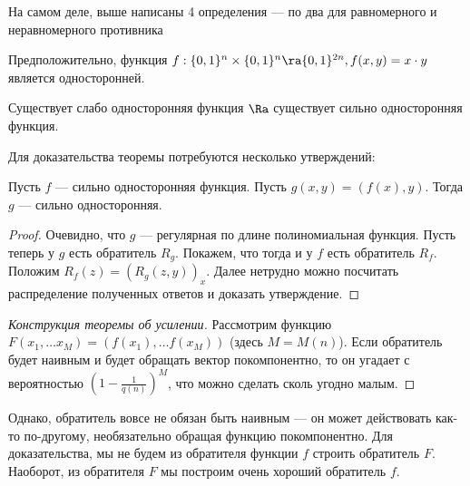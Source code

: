 \begin{note}
    На самом деле, выше написаны 4 определения --- по два для равномерного и неравномерного противника
\end{note}

\begin{note}
    Предположительно, функция \(f: \{0, 1\}^n \times \{0, 1\}^n \ra \{0, 1\}^{2n}, f(x, y) = x \cdot y\) является односторонней.
\end{note}

\begin{theorem}[Об усилении]
    Существует слабо односторонняя функция \(\Ra\) существует сильно односторонняя функция.
\end{theorem}

Для доказательства теоремы потребуются несколько утверждений:

\begin{proposition}
    Пусть \(f\) --- сильно односторонняя функция. Пусть \(g(x, y) = (f(x), y)\). Тогда \(g\) --- сильно односторонняя.
\end{proposition}
\begin{proof}
    Очевидно, что \(g\) --- регулярная по длине полиномиальная функция. Пусть теперь у \(g\) есть обратитель \(R_g\). Покажем, что тогда и у \(f\) есть обратитель \(R_f\). Положим \(R_f(z) = (R_g(z, y))_x\). Далее нетрудно можно посчитать распределение полученных ответов и доказать утверждение.
\end{proof}

\begin{proof}[Конструкция теоремы об усилении]
    Рассмотрим функцию \(F(x_1, \dots x_M) = (f(x_1), \dots f(x_M))\) (здесь \(M = M(n)\)). Если обратитель будет наивным и будет обращать вектор покомпонентно, то он угадает с вероятностью \(\left( 1 - \frac{1}{q(n)} \right)^M\), что можно сделать сколь угодно малым.
\end{proof}


Однако, обратитель вовсе не обязан быть наивным --- он может действовать как-то по-другому, необязательно обращая функцию покомпонентно. Для доказательства, мы не будем из обратителя функции \(f\) строить обратитель \(F\). Наоборот, из обратителя \(F\) мы построим очень хороший обратитель \(f\).

